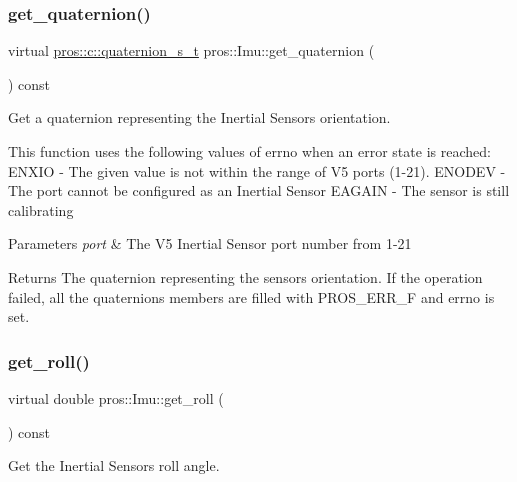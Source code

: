 \subsubsection{\texorpdfstring{get\+\_\+quaternion()}{get\_quaternion()}}
{\footnotesize\ttfamily virtual \hyperlink{imu_8h_a1f3d4bf4251e6ce7cb374297de6390a1}{pros\+::c\+::quaternion\+\_\+s\+\_\+t} pros\+::\+Imu\+::get\+\_\+quaternion (\begin{DoxyParamCaption}{ }\end{DoxyParamCaption}) const\hspace{0.3cm}{\ttfamily [virtual]}}



Get a quaternion representing the Inertial Sensor\textquotesingle{}s orientation. 

This function uses the following values of errno when an error state is reached\+: E\+N\+X\+IO -\/ The given value is not within the range of V5 ports (1-\/21). E\+N\+O\+D\+EV -\/ The port cannot be configured as an Inertial Sensor E\+A\+G\+A\+IN -\/ The sensor is still calibrating


\begin{DoxyParams}{Parameters}
{\em port} & The V5 Inertial Sensor port number from 1-\/21 \\
\hline
\end{DoxyParams}
\begin{DoxyReturn}{Returns}
The quaternion representing the sensor\textquotesingle{}s orientation. If the operation failed, all the quaternion\textquotesingle{}s members are filled with P\+R\+O\+S\+\_\+\+E\+R\+R\+\_\+F and errno is set. 
\end{DoxyReturn}
\mbox{\label{classpros_1_1Imu_a8ec8c7bbb7ee9d9d1c9dca5d992c57b1}} 
\subsubsection{\texorpdfstring{get\+\_\+roll()}{get\_roll()}}
{\footnotesize\ttfamily virtual double pros\+::\+Imu\+::get\+\_\+roll (\begin{DoxyParamCaption}{ }\end{DoxyParamCaption}) const\hspace{0.3cm}{\ttfamily [virtual]}}



Get the Inertial Sensor\textquotesingle{}s roll angle. 

